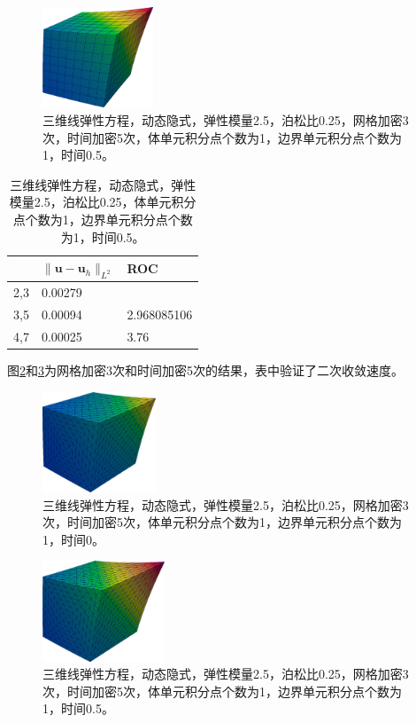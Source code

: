 \begin{figure}[!htbp]
  \centering
  \includegraphics[height=3cm]{fig/4/4.1.4/2.png}
  \caption{三维线弹性方程，动态隐式，弹性模量2.5，泊松比0.25，网格加密3次，时间加密5次，体单元积分点个数为1，边界单元积分点个数为1，时间0.5。}
  \label{fig:4.1.4:2}
\end{figure}


\begin{table}[!htbp]
  \centering
  \begin{tabular}{c|l|l}
    & $\|\mathbf u-\mathbf u_h\|_{L^2}$ & ROC\\
    \hline
    2,3 & 0.00279 &  \\
    \hline
    3,5 & 0.00094    & 2.968085106 \\
    \hline
    4,7 & 0.00025   &     3.76
  \end{tabular}
  \caption{三维线弹性方程，动态隐式，弹性模量2.5，泊松比0.25，体单元积分点个数为1，边界单元积分点个数为1，时间0.5。}
\end{table}

图\ref{fig:4.1.4:3}和\ref{fig:4.1.4:4}为网格加密3次和时间加密5次的结果，表中验证了二次收敛速度。

\begin{figure}[!htbp]
  \centering
  \includegraphics[height=3cm]{fig/4/4.1.4/3.png}
  \caption{三维线弹性方程，动态隐式，弹性模量2.5，泊松比0.25，网格加密3次，时间加密5次，体单元积分点个数为1，边界单元积分点个数为1，时间0。}
  \label{fig:4.1.4:3}
\end{figure}

\begin{figure}[!htbp]
  \centering
  \includegraphics[height=3cm]{fig/4/4.1.4/4.png}
  \caption{三维线弹性方程，动态隐式，弹性模量2.5，泊松比0.25，网格加密3次，时间加密5次，体单元积分点个数为1，边界单元积分点个数为1，时间0.5。}
  \label{fig:4.1.4:4}
\end{figure}


